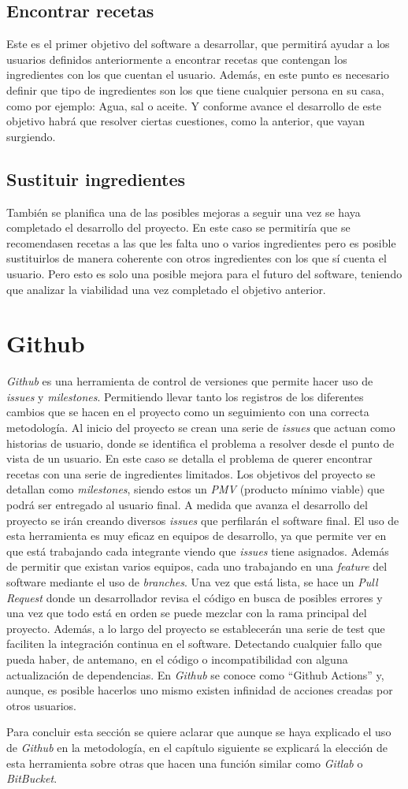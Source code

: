\subsection{Encontrar recetas}
Este es el primer objetivo del software a desarrollar, que permitirá ayudar a los usuarios definidos anteriormente a encontrar recetas que contengan los ingredientes con los que cuentan el usuario. Además, en este punto es necesario definir que tipo de ingredientes son los que tiene cualquier persona en su casa, como por ejemplo: Agua, sal o aceite. Y conforme avance el desarrollo de este objetivo habrá que resolver ciertas cuestiones, como la anterior, que vayan surgiendo. 

\subsection{Sustituir ingredientes}
También se planifica una de las posibles mejoras a seguir una vez se haya completado el desarrollo del proyecto. En este caso se permitiría que se recomendasen recetas a las que les falta uno o varios ingredientes pero es posible sustituirlos de manera coherente con otros ingredientes con los que sí cuenta el usuario. Pero esto es solo una posible mejora para el futuro del software, teniendo que analizar la viabilidad una vez completado el objetivo anterior. 

\section{Github}
\emph{Github} es una herramienta de control de versiones que permite hacer uso de \emph{issues} y \emph{milestones}. Permitiendo llevar tanto los registros de los diferentes cambios que se hacen en el proyecto como un seguimiento con una correcta metodología. Al inicio del proyecto se crean una serie de \emph{issues} que actuan como historias de usuario, donde se identifica el problema a resolver desde el punto de vista de un usuario. En este caso se detalla el problema de querer encontrar recetas con una serie de ingredientes limitados. Los objetivos del proyecto se detallan como \emph{milestones}, siendo estos un \emph{PMV} (producto mínimo viable) que podrá ser entregado al usuario final. A medida que avanza el desarrollo del proyecto se irán creando diversos \emph{issues} que perfilarán el software final. El uso de esta herramienta es muy eficaz en equipos de desarrollo, ya que permite ver en que está trabajando cada integrante viendo que \emph{issues} tiene asignados. Además de permitir que existan varios equipos, cada uno trabajando en una \emph{feature} del software mediante el uso de \emph{branches}. Una vez que está lista, se hace un \emph{Pull Request} donde un desarrollador revisa el código en busca de posibles errores y una vez que todo está en orden se puede mezclar con la rama principal del proyecto. Además, a lo largo del proyecto se establecerán una serie de test que faciliten la integración continua en el software. Detectando cualquier fallo que pueda haber, de antemano, en el código o incompatibilidad con alguna actualización de dependencias. En \emph{Github} se conoce como ``Github Actions'' y, aunque, es posible hacerlos uno mismo existen infinidad de acciones creadas por otros usuarios.

Para concluir esta sección se quiere aclarar que aunque se haya explicado el uso de \emph{Github} en la metodología, en el capítulo siguiente se explicará la elección de esta herramienta sobre otras que hacen una función similar como \emph{Gitlab} o \emph{BitBucket}.
